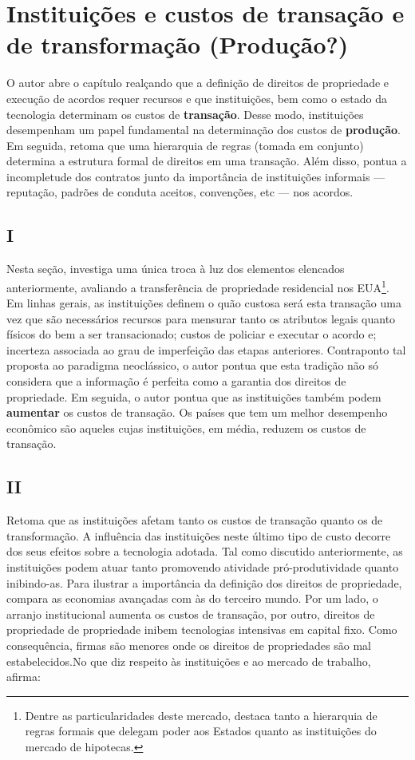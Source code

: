 \section*{Instituições e custos de transação e de transformação (Produção?)}

O autor abre o capítulo realçando que a definição de direitos de propriedade e execução de acordos requer recursos e que instituições, bem como o estado da tecnologia determinam os custos de \textbf{transação}. Desse modo, instituições desempenham um papel fundamental na determinação dos custos de \textbf{produção}. Em seguida, retoma que uma hierarquia de regras (tomada em conjunto) determina a estrutura formal de direitos em uma transação. Além disso, pontua a incompletude dos contratos junto da importância de instituições informais --- reputação, padrões de conduta aceitos, convenções, etc --- nos acordos.

\subsection*{I}

Nesta seção, \autor investiga uma única troca à luz dos elementos elencados anteriormente, avaliando a transferência de propriedade residencial nos EUA\footnote{Dentre as particularidades deste mercado, destaca tanto a hierarquia de regras formais que delegam poder aos Estados quanto as instituições do mercado de hipotecas.}. Em linhas gerais, as instituições definem o quão custosa será esta transação uma vez que são necessários recursos para mensurar tanto os atributos legais quanto físicos do bem a ser transacionado; custos de policiar e executar o acordo e; incerteza associada ao grau de imperfeição das etapas anteriores. Contraponto tal proposta ao paradigma neoclássico, o autor pontua que esta tradição não só considera que a informação é perfeita como a garantia dos direitos de propriedade. Em seguida, o autor pontua que as instituições também podem \textbf{aumentar} os custos de transação. Os países que tem um melhor desempenho econômico são aqueles cujas instituições, em média, reduzem os custos de transação.

\subsection*{II}

Retoma que as instituições afetam tanto os custos de transação quanto os de transformação. A influência das instituições neste último tipo de custo decorre dos seus efeitos sobre a tecnologia adotada. Tal como discutido anteriormente, as instituições podem atuar tanto promovendo atividade pró-produtividade quanto inibindo-as. Para ilustrar a importância da definição dos direitos de propriedade, compara as economias avançadas com às do terceiro mundo. Por um lado, o arranjo institucional aumenta os custos de transação, por outro, direitos de propriedade de propriedade inibem tecnologias intensivas em capital fixo. Como consequência, firmas são menores onde os direitos de propriedades são mal estabelecidos.No que diz respeito às instituições e ao mercado de trabalho, afirma:

